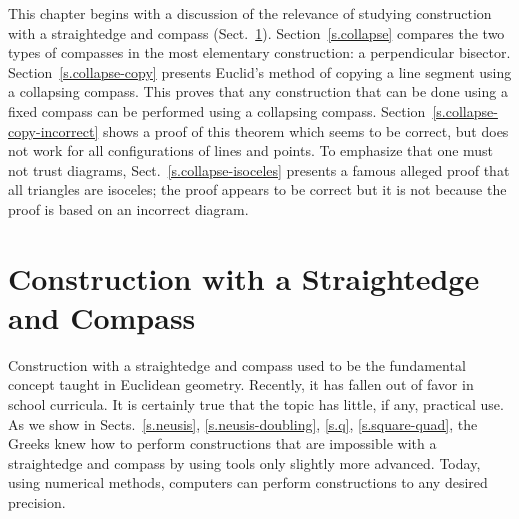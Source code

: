 \begin{figure}[hb]
{
}
\label{fig.fixed-compass}
\label{fig.collapsing-compass}
\end{figure}

This chapter begins with a discussion of the relevance of studying construction with a straightedge and compass (Sect.~\ref{s.relevance}).
Section~\ref{s.collapse} compares the two types of compasses in the most elementary construction: a perpendicular bisector. Section~\ref{s.collapse-copy} presents Euclid's method of copying a line segment using a collapsing compass. This proves that any construction that can be done using a fixed compass can be performed using a collapsing compass. Section~\ref{s.collapse-copy-incorrect} shows a proof of this theorem which seems to be correct, but does not work for all configurations of lines and points. To emphasize that one must not trust diagrams, Sect.~\ref{s.collapse-isoceles} presents a famous alleged proof that all triangles are isoceles; the proof appears to be correct but it is not because the proof is based on an incorrect diagram.

\section{Construction with a Straightedge and Compass}\label{s.relevance}

Construction with a straightedge and compass used to be the fundamental concept taught in Euclidean geometry. Recently, it has fallen out of favor in school curricula. It is certainly true that the topic has little, if any, practical use. As we show in Sects.~\ref{s.neusis}, \ref{s.neusis-doubling}, \ref{s.q}, \ref{s.square-quad}, the Greeks knew how to perform constructions that are impossible with a straightedge and compass by using tools only slightly more advanced. Today, using numerical methods, computers can perform constructions to any desired precision.

